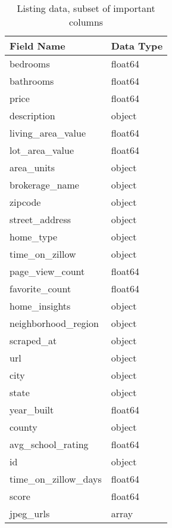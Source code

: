 \begin{table}[h]

  \centering
  \begin{tabular}{ll}
    \toprule
    \textbf{Field Name}       & \textbf{Data Type}     \\
    \midrule
    bedrooms                  & float64                \\
    bathrooms                 & float64                \\
    price                     & float64                \\
    description               & object                 \\
    living\_area\_value       & float64                \\
    lot\_area\_value          & float64                \\
    area\_units               & object                 \\
    brokerage\_name           & object                 \\
    zipcode                   & object                 \\
    street\_address           & object                 \\
    home\_type                & object                 \\
    time\_on\_zillow          & object                 \\
    page\_view\_count         & float64                \\
    favorite\_count           & float64                \\
    home\_insights            & object                 \\
    neighborhood\_region      & object                 \\
    scraped\_at               & object                 \\
    url                       & object                 \\
    city                      & object                 \\
    state                     & object                 \\
    year\_built               & float64                \\
    county                    & object                 \\
    avg\_school\_rating       & float64                \\
    id                        & object                 \\
    time\_on\_zillow\_days    & float64                \\
    score                     & float64                \\
    jpeg\_urls                & array                  \\
    \bottomrule
  \end{tabular}
   \caption{Listing data, subset of important columns}
  \label{tab:property-table}
\end{table}
